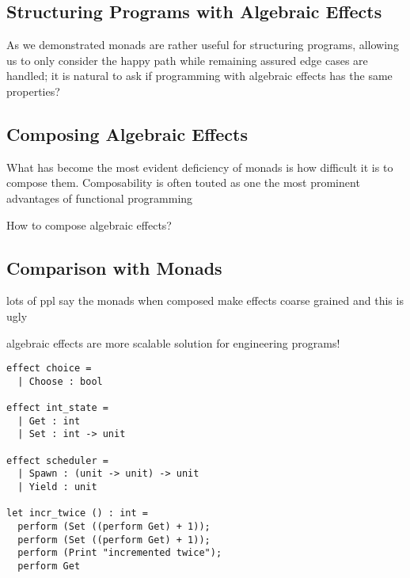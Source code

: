 \subsection{Structuring Programs with Algebraic Effects}
As we demonstrated monads are rather useful for structuring programs,
allowing us to only consider the happy path while remaining assured
edge cases are handled;
it is natural to ask if programming with algebraic effects
has the same properties?

\begin{example}
\end{example}

\subsection{Composing Algebraic Effects}
What has become the most evident deficiency of monads is
how difficult it is to compose them.
Composability is often touted as one the most
prominent advantages of functional programming

How to compose algebraic effects?
\begin{example}
\end{example}

\subsection{Comparison with Monads}
lots of ppl say the monads when composed make effects coarse grained
and this is ugly


algebraic effects are more scalable solution for engineering programs!
\begin{verbatim}
effect choice =
  | Choose : bool

effect int_state =
  | Get : int
  | Set : int -> unit

effect scheduler =
  | Spawn : (unit -> unit) -> unit
  | Yield : unit

let incr_twice () : int =
  perform (Set ((perform Get) + 1));
  perform (Set ((perform Get) + 1));
  perform (Print "incremented twice");
  perform Get
\end{verbatim}
